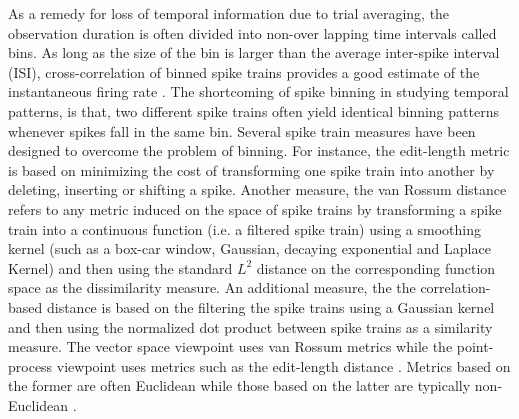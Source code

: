 As a remedy for loss of temporal information due to trial averaging, the observation duration is often divided into non-over lapping time intervals called bins. As long as the size of the bin is larger than the average inter-spike interval (ISI), cross-correlation of binned spike trains provides a good estimate of the instantaneous firing rate \cite{Brown2004}. The shortcoming of spike binning in studying temporal patterns, is that, two different spike trains often yield identical binning patterns whenever spikes fall in the same bin. Several spike train measures have been designed to overcome the problem of binning. For instance, the edit-length metric \cite{Victor1996, Victor1998} is based on minimizing the cost of transforming one spike train into another by deleting, inserting or shifting a spike. Another measure, the van Rossum distance \cite{Rossum2001, houghton2010measuring} refers to any metric induced on the space of spike trains by transforming a spike train into a continuous function (i.e. a filtered spike train) using a smoothing kernel (such as a box-car window, Gaussian, decaying exponential and  Laplace Kernel) and then using the standard $L^2$ distance on the corresponding function space as the dissimilarity measure. An additional measure, the the correlation-based distance \cite{Schreiber2003} is based on the filtering the spike trains using a Gaussian kernel and then using the normalized dot product between  spike trains as a  similarity measure.
The vector space viewpoint uses van Rossum metrics while the point-process viewpoint uses metrics such as the edit-length distance \cite{Victor2005}. 
Metrics based on the former are often Euclidean while those based on the latter are typically non-Euclidean \cite{Aronov2004}.\\


